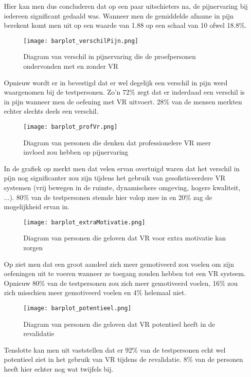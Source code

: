 Hier kan men dus concluderen dat op een paar uitschieters na, de pijnervaring bij iedereen significant gedaald was. Wanneer men de gemiddelde afname in pijn berekent komt men uit op een waarde van 1.88 op een schaal van 10 ofwel 18.8\%.

\begin{figure}[h]
    \centering
    \texttt{[image: barplot\_verschilPijn.png]}
    \caption{Diagram van verschil in pijnervaring die de proefpersonen ondervonden met en zonder VR}
\end{figure}

\newpage

Opnieuw wordt er in \cite{Figuur 6.7} bevestigd dat er wel degelijk een verschil in pijn werd waargenomen bij de testpersonen. Zo'n 72\% zegt dat er inderdaad een verschil is in pijn wanneer men de oefening met VR uitvoert. 28\% van de mensen merkten echter slechts deels een verschil.

\begin{figure}[h]
    \centering
    \texttt{[image: barplot\_profVr.png]}
    \caption{Diagram van personen die denken dat professionelere VR meer invloed zou hebben op pijnervaring}
\end{figure}

In de grafiek op \cite{Figuur 6.8} merkt men dat velen ervan overtuigd waren dat het verschil in pijn nog significanter zou zijn tijdens het gebruik van gesofisticeerdere VR systemen (vrij bewegen in de ruimte, dynamischere omgeving, hogere kwaliteit, ...). 80\% van de testpersonen stemde hier volop mee in en 20\% zag de mogelijkheid ervan in.

\begin{figure}[h]
    \centering
    \texttt{[image: barplot\_extraMotivatie.png]}
    \caption{Diagram van personen die geloven dat VR voor extra motivatie kan zorgen}
\end{figure}

Op \cite{Figuur 6.9} ziet men dat een groot aandeel zich meer gemotiveerd zou voelen om zijn oefeningen uit te voeren wanneer ze toegang zouden hebben tot een VR systeem. Opnieuw 80\% van de testpersonen zou zich meer gemotiveerd voelen, 16\% zou zich misschien meer gemotiveerd voelen en 4\% helemaal niet.

\begin{figure}[h]
    \centering
    \texttt{[image: barplot\_potentieel.png]}
    \caption{Diagram van personen die geloven dat VR potentieel heeft in de revalidatie}
\end{figure}

Tenslotte kan men uit \cite{Figuur 6.10} vaststellen dat er 92\% van de testpersonen echt wel potentieel ziet in het gebruik van VR tijdens de revalidatie. 8\% van de personen heeft hier echter nog wat twijfels bij.




